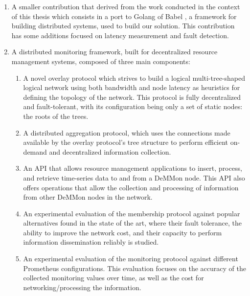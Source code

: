 \begin{enumerate}

    \item A smaller contribution that derived from the work conducted in the context of this thesis which consists in a port to Golang of Babel \cite{babel}, a framework for building distributed systems, used to build our solution. This contribution has some additions focused on latency measurement and fault detection.

    \item A distributed monitoring framework, built for decentralized resource management systems, composed of three main components: {
        \begin{enumerate}
            \item A novel overlay protocol which strives to build a logical multi-tree-shaped logical network using both bandwidth and node latency as heuristics for defining the topology of the network. This protocol is fully decentralized and fault-tolerant, with its configuration being only a set of static nodes: the roots of the trees.
            
            \item A distributed aggregation protocol, which uses the connections made available by the overlay protocol's tree structure to perform efficient on-demand and decentralized information collection.
            
            \item An API that allows resource management applications to insert, process, and retrieve time-series data to and from a DeMMon node. This API also offers operations that allow the collection and processing of information from other DeMMon nodes in the network. 
            
            \item An experimental evaluation of the membership protocol against popular alternatives found in the state of the art, where their fault tolerance, the ability to improve the network cost, and their capacity to perform information dissemination reliably is studied. 

            \item An experimental evaluation of the monitoring protocol against different Prometheus \cite{prometheus} configurations. This evaluation focuses on the accuracy of the collected monitoring values over time, as well as the cost for networking/processing the information.
            

\end{enumerate}}
\end{enumerate}
